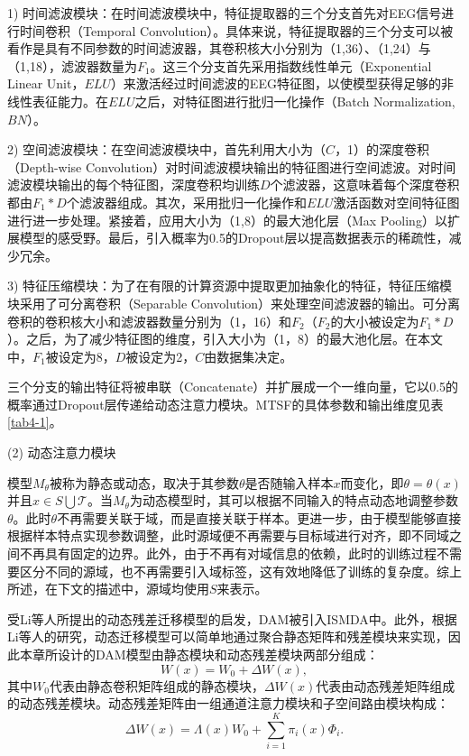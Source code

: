 1) 时间滤波模块：在时间滤波模块中，特征提取器的三个分支首先对EEG信号进行时间卷积（Temporal Convolution）。具体来说，特征提取器的三个分支可以被看作是具有不同参数的时间滤波器，其卷积核大小分别为（1,36）、（1,24）与（1,18），滤波器数量为$F_1$。这三个分支首先采用指数线性单元（Exponential Linear Unit，$ELU$）来激活经过时间滤波的EEG特征图，以使模型获得足够的非线性表征能力。在$ELU$之后，对特征图进行批归一化操作（Batch Normalization, $BN$）。

2) 空间滤波模块：在空间滤波模块中，首先利用大小为（$C$，1）的深度卷积（Depth-wise Convolution）对时间滤波模块输出的特征图进行空间滤波。对时间滤波模块输出的每个特征图，深度卷积均训练$D$个滤波器，这意味着每个深度卷积都由$F_1*D$个滤波器组成。其次，采用批归一化操作和$ELU$激活函数对空间特征图进行进一步处理。紧接着，应用大小为（1,8）的最大池化层（Max Pooling）以扩展模型的感受野。最后，引入概率为0.5的Dropout层以提高数据表示的稀疏性，减少冗余。

3) 特征压缩模块：为了在有限的计算资源中提取更加抽象化的特征，特征压缩模块采用了可分离卷积（Separable Convolution）来处理空间滤波器的输出。可分离卷积的卷积核大小和滤波器数量分别为（1，16）和$F_2$（$F_2$的大小被设定为$F_1*D$）。之后，为了减少特征图的维度，引入大小为（1，8）的最大池化层。在本文中，$F_{1}$被设定为8，$D$被设定为2，$C$由数据集决定。

三个分支的输出特征将被串联（Concatenate）并扩展成一个一维向量，它以0.5的概率通过Dropout层传递给动态注意力模块。MTSF的具体参数和输出维度见表\ref{tab4-1}。

(2) 动态注意力模块

模型$M_{\theta}$被称为静态或动态，取决于其参数$\theta$是否随输入样本$x$而变化，即$\theta=\theta(x)$并且$x\in S \bigcup \mathcal{T}$。当$M_{\theta}$为动态模型时，其可以根据不同输入的特点动态地调整参数$\theta$。此时$\theta$不再需要关联于域，而是直接关联于样本。更进一步，由于模型能够直接根据样本特点实现参数调整，此时源域便不再需要与目标域进行对齐，即不同域之间不再具有固定的边界。此外，由于不再有对域信息的依赖，此时的训练过程不需要区分不同的源域，也不再需要引入域标签，这有效地降低了训练的复杂度。综上所述，在下文的描述中，源域均使用$S$来表示。

受Li等人\cite{4-3}所提出的动态残差迁移模型的启发，DAM被引入ISMDA中。此外，根据Li等人\cite{4-3}的研究，动态迁移模型可以简单地通过聚合静态矩阵和残差模块来实现，因此本章所设计的DAM模型由静态模块和动态残差模块两部分组成：
\begin{equation}
\label{deqn_ex1}
W(x)=W_{0}+\Delta {W}({x}),
\end{equation}
其中$W_{0}$代表由静态卷积矩阵组成的静态模块，$\Delta {W}({x})$代表由动态残差矩阵组成的动态残差模块。动态残差矩阵由一组通道注意力模块和子空间路由模块构成：
\begin{equation}
\label{deqn_ex2}
\Delta {W}({x})={\Lambda}({x}) {W}_{0}+\sum_{i=1}^{K} \pi_{i}(x){\Phi}_{i}.
\end{equation}

